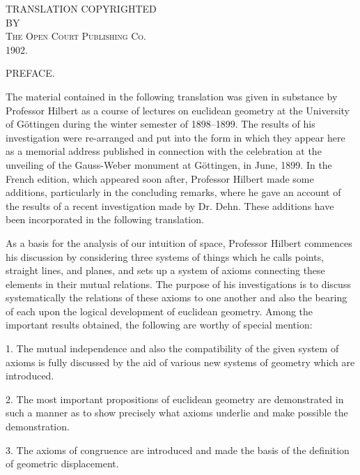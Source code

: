 \documentclass[11pt,oneside]{book}
\begin{document}
\mainmatter
\vspace*{7cm}
\begin{center}
{\tiny TRANSLATION COPYRIGHTED}\\[3mm]
{\tiny BY}\\[3mm]
{\small \scshape{The Open Court Publishing Co.}}\\[3mm]
{\tiny 1902.}
\end{center}
\clearpage
\begin{center}{\Large PREFACE.}\end{center}
\medskip
\begin{small}
The material contained in the following translation was given
in substance by Professor Hilbert as a course of lectures on
euclidean geometry at the University of G\"ottingen during the
winter semester of 1898--1899. The results of his investigation
were re-arranged and put into the form in which they appear here
as a memorial address published in connection with the celebration
at the unveiling of the Gauss-Weber monument at G\"ottingen,
in June, 1899. In the French edition, which appeared soon after,
Professor Hilbert made some additions, particularly in the concluding
remarks, where he gave an account of the results of a recent
investigation made by Dr. Dehn. These additions have been
incorporated in the following translation.

As a basis for the analysis of our intuition of space, Professor
Hilbert commences his discussion by considering three systems of
things which he calls points, straight lines, and planes, and sets
up a system of axioms connecting these elements in their mutual
relations. The purpose of his investigations is to discuss systematically
the relations of these axioms to one another and also the
bearing of each upon the logical development of euclidean geometry.
Among the important results obtained, the following are
worthy of special mention:

1. The mutual independence and also the compatibility of the
given system of axioms is fully discussed by the aid of various new
systems of geometry which are introduced.

2. The most important propositions of euclidean geometry are
demonstrated in such a manner as to show precisely what axioms
underlie and make possible the demonstration.

3. The axioms of congruence are introduced and made the
basis of the definition of geometric displacement.


\end{small}
\end{document}
